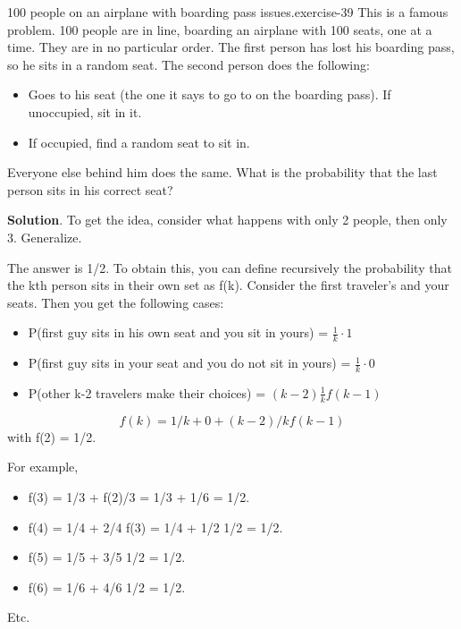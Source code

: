 \documentclass[10pt,]{book}
\numberwithin{equation}{section}
\begin{document}
\begin{inlineexercise}{100 people on an airplane with boarding pass issues.}{exercise-39}%
\hypertarget{p-619}{}%
This is a famous problem.  100 people are in line, boarding an airplane with 100 seats, one at a time. They are in no particular order. The first person has lost his boarding pass, so he sits in a random seat. The second person does the following: \leavevmode%
\begin{itemize}[label=\textbullet]
\item{}Goes to his seat (the one it says to go to on the boarding pass). If unoccupied, sit in it.%
\item{}If occupied, find a random seat to sit in.%
\end{itemize}
 Everyone else behind him does the same. What is the probability that the last person sits in his correct seat?%
\par\smallskip%
\noindent\textbf{Solution}.\hypertarget{solution-17}{}\quad%
\hypertarget{p-620}{}%
To get the idea, consider what happens with only 2 people, then only 3. Generalize.%
\par
\hypertarget{p-621}{}%
The answer is 1/2. To obtain this, you can define recursively the probability that the kth person sits in their own set as f(k).  Consider the first traveler's and your seats. Then you get the following cases: \leavevmode%
\begin{itemize}[label=\textbullet]
\item{}P(first guy sits in his own seat and you sit in yours) = \(\frac{1}{k} \cdot 1\)%
\item{}P(first guy sits in your seat and you do not sit in yours) = \(\frac{1}{k} \cdot 0\)%
\item{}P(other k-2 travelers make their choices) = \((k-2) \frac{1}{k} f(k-1)\)%
\end{itemize}
%
\begin{equation*}
f(k) = 1/k + 0 + (k-2)/k f(k-1)
\end{equation*}
with f(2) = 1/2.%
\par
\hypertarget{p-622}{}%
For example, \leavevmode%
\begin{itemize}[label=\textbullet]
\item{}f(3) = 1/3 + f(2)/3 = 1/3 + 1/6 = 1/2.%
\item{}f(4) = 1/4 + 2/4 f(3) = 1/4 + 1/2 1/2 = 1/2.%
\item{}f(5) = 1/5 + 3/5 1/2 = 1/2.%
\item{}f(6) = 1/6 + 4/6 1/2 = 1/2.%
\end{itemize}
 Etc.%
\end{inlineexercise}
\end{document}
